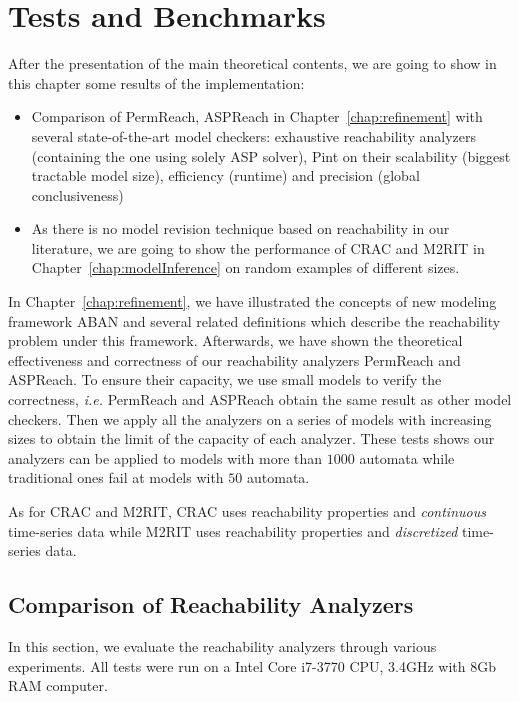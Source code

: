 \chapter{Tests and Benchmarks}\label{chap:test}
\begin{mybox}
After the presentation of the main theoretical contents, we are going to show in this chapter some results of the implementation:

\begin{itemize}
    \item Comparison of PermReach, ASPReach in Chapter~\ref{chap:refinement} with several state-of-the-art model checkers: exhaustive reachability analyzers (containing the one using solely ASP solver), Pint on their scalability (biggest tractable model size), efficiency (runtime) and precision (global conclusiveness)
    \item As there is no model revision technique based on reachability in our literature, we are going to show the performance of CRAC and M2RIT in Chapter~\ref{chap:modelInference} on random examples of different sizes.
\end{itemize}
\end{mybox}

In Chapter~\ref{chap:refinement}, we have illustrated the concepts of new modeling framework ABAN and several related definitions which describe the reachability problem under this framework.
Afterwards, we have shown the theoretical effectiveness and correctness of our reachability analyzers PermReach and ASPReach. 
To ensure their capacity, we use small models to verify the correctness, \textit{i.e.} PermReach and ASPReach obtain the same result as other model checkers.
Then we apply all the analyzers on a series of models with increasing sizes to obtain the limit of the capacity of each analyzer.
These tests shows our analyzers can be applied to models with more than $1000$ automata while traditional ones fail at models with $50$ automata.

As for CRAC and M2RIT, CRAC uses reachability properties and \textit{continuous} time-series data while M2RIT uses reachability properties and \textit{discretized} time-series data.


\section{Comparison of Reachability Analyzers}\label{sec:compReachAnalyzers}
In this section, we evaluate the reachability analyzers through various experiments.
All tests were run on a Intel Core i7-3770 CPU, \@3.4GHz with 8Gb RAM computer.

